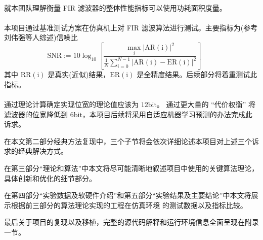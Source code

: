 \paragraph{}
就本团队理解衡量 FIR 滤波器的整体性能指标可以使用功耗面积度量。

\paragraph{}
本项目通过基准测试方案在仿真机上对 FIR 滤波算法进行测试。主要指标为(参考刘伟强等人综述\cite{Liu2019})信噪比
\begin{equation*}
    \mathrm{SNR} := 10 \log_{10} \left[\frac{\max_{i}|\mathrm{AR(i)}|^{2}}{\frac{1}{N}\sum_{i=0}^{N-1}
    |\mathrm{AR(i) - ER(i)}|^{2}}\right]\qquad \tag{A5}
\end{equation*}
其中 $\mathrm{RR(i)}$ 是真实(近似)结果，$\mathrm{ER(i)}$ 是全精度结果。后续部分将着重测试此指标。

\paragraph{}
通过理论计算确定实现位宽的理论值应该为 $12 \mathrm{bit}$。
通过更大量的 ``代价权衡'' 将滤波器的位宽降低到 $6 \mathrm{bit}$，本项目后续将采用自适应机器学习预测的办法完成此诉求。

在本文第二部分经典方法复现中，三个子节将会依次详细论述本项目对上述三个诉求的经典解决方式。

在第三部分``理论和算法''中本文将尽可能清晰地叙述项目中使用的关键算法理论，具体创新和优化的细节部分。

在第四部分``实验数据及软硬件介绍''和第五部分``实验结果及主要结论''中本文将展示根据前三部分的算法理论实现的工程在仿真环境
的测试数据以及指标比较。

最后关于项目的复现以及移植，完整的源代码解释和运行环境信息全面呈现在附录一节。

